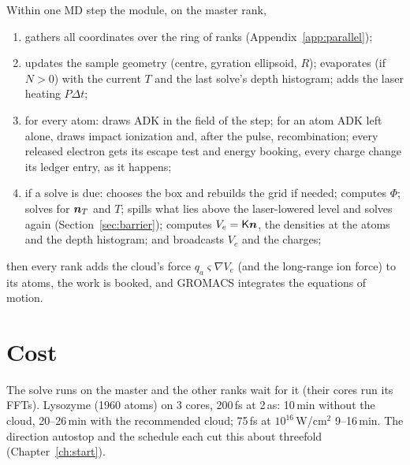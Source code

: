 Within one MD step the module, on the master rank,
\begin{enumerate}
  \item gathers all coordinates over the ring of ranks (Appendix~\ref{app:parallel});
  \item updates the sample geometry (centre, gyration ellipsoid, $R$); evaporates (if $N>0$) with the current $T$
    and the last solve's depth histogram; adds the laser heating $P\Delta t$;
  \item for every atom: draws ADK in the field of the step; for an atom ADK left alone, draws impact ionization and,
    after the pulse, recombination; every released electron gets its escape test and energy booking, every charge
    change its ledger entry, as it happens;
  \item if a solve is due: chooses the box and rebuilds the grid if needed; computes $\Phi$; solves for $\bm{n}_T$ and
    $T$; spills what lies above the laser-lowered level and solves again (Section~\ref{sec:barrier}); computes
    $V_e = \mathsf K\bm{n}$, the densities at the atoms and the depth histogram; and broadcasts $V_e$ and the charges;
\end{enumerate}
then every rank adds the cloud's force $q_a\varsigma\nabla V_e$ (and the long-range ion force) to its atoms, the work is
booked, and GROMACS integrates the equations of motion.

\section{Cost}

The solve runs on the master and the other ranks wait for it (their cores run its FFTs).
Lysozyme (1960 atoms) on 3 cores, 200\,fs at 2\,as: 10\,min without the cloud, 20--26\,min with the recommended cloud;
75\,fs at $10^{16}$\,W/cm$^2$ 9--16\,min.
The direction autostop and the schedule each cut this about threefold (Chapter~\ref{ch:start}).
